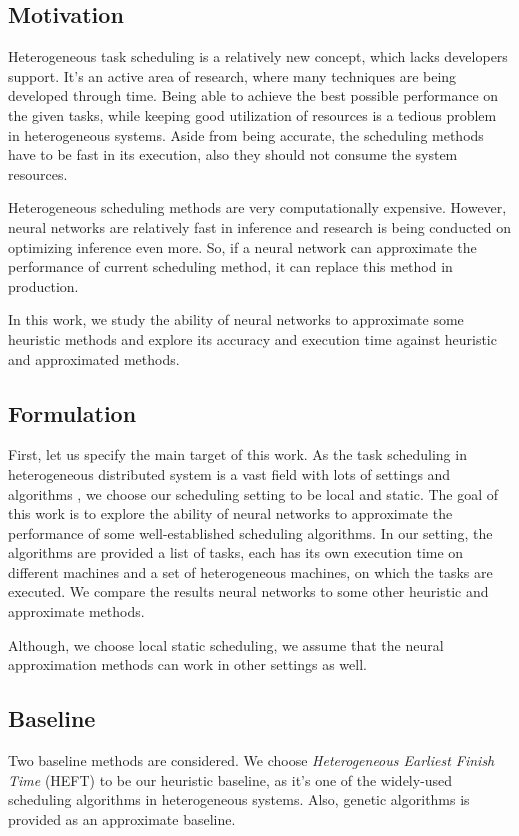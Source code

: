 \subsection{Motivation}
Heterogeneous task scheduling is a relatively new concept, which lacks developers support. It's an active area of research, where many techniques are being developed through time. Being able to achieve the best possible performance on the given tasks, while keeping good utilization of resources is a tedious problem in heterogeneous systems. Aside from being accurate, the scheduling methods have to be fast in its execution, also they should not consume the system resources. 

Heterogeneous scheduling methods are very computationally expensive. However, neural networks are relatively fast in inference and research is being conducted on optimizing inference even more. So, if a neural network can approximate the performance of current scheduling method, it can replace this method in production. 

In this work, we study the ability of neural networks to approximate some heuristic methods and explore its accuracy and execution time against heuristic and approximated methods.

\subsection{Formulation}
First, let us specify the main target of this work. As the task scheduling in heterogeneous distributed system is a vast field with lots of settings and algorithms \cite{inbook}, we choose our scheduling setting to be local and static. The goal of this work is to explore the ability of neural networks to approximate the performance of some well-established scheduling algorithms. In our setting, the algorithms are provided a list of tasks, each has its own execution time on different machines and a set of heterogeneous machines, on which the tasks are executed. We compare the results neural networks to some other heuristic and approximate methods.

Although, we choose local static scheduling, we assume that the neural approximation methods can work in other settings as well.

\subsection{Baseline}
Two baseline methods are considered. We choose \emph{Heterogeneous Earliest Finish Time} (HEFT) \cite{993206} to be our heuristic baseline, as it's one of the widely-used scheduling algorithms in heterogeneous systems. Also, genetic algorithms \cite{article2} is provided as an approximate baseline. \\

